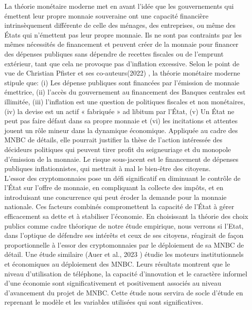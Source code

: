 \documentclass[12pt]{article}
\begin{document}
La théorie monétaire moderne met en avant l'idée que les gouvernements qui émettent leur propre monnaie souveraine ont une capacité financière intrinsèquement différente de celle des ménages, des entreprises, ou même des États qui n'émettent pas leur propre monnaie. Ils ne sont pas contraints par les mêmes nécessités de financement et peuvent créer de la monnaie pour financer des dépenses publiques sans dépendre de recettes fiscales ou de l'emprunt extérieur, tant que cela ne provoque pas d'inflation excessive. Selon le point de vue de Christian Pfister et ses co-auteurs(2022) \cite{drumetz_modern_2021}, la théorie monétaire moderne stipule que: (i) Les dépense publiques sont financées par l’émission de monnaie émettrice, (ii) l’accès du gouvernement au financement des Banques centrales est illimitée, (iii) l’inflation est une question de politiques fiscales et non monétaires, (iv) la devise est un actif « fabriquée » ad libitum par l’État, (v) Un État ne peut pas faire défaut dans sa propre monnaie et (vi) les incitations et attentes jouent un rôle mineur dans la dynamique économique. Appliquée au cadre des MNBC de détails, elle pourrait justifier la thèse de l'action intéressée des décideurs politiques qui peuvent tirer profit du seigneuriage et du monopole d'émission de la monnaie. Le risque sous-jacent est le financement de dépenses publiques inflationnistes, qui mettrait à mal le bien-être des citoyens. \\

L'essor des cryptomonnaies pose un défi significatif en diminuant le contrôle de l'État sur l'offre de monnaie, en compliquant la collecte des impôts, et en introduisant une concurrence qui peut éroder la demande pour la monnaie nationale. Ces facteurs combinés compromettent la capacité de l'État à gérer efficacement sa dette et à stabiliser l'économie. En choisissant la théorie des choix publics comme cadre théorique de notre étude empirique, nous verrons si l'Etat, dans l'optique de défendre ses intérêts et ceux de ses citoyens, réagirait de façon proportionnelle à l'essor des cryptomonnaies par le déploiement de sa MNBC de détail. Une étude similaire (Auer et al., 2023 \cite{RePEc:bis:biswps:880}) étudie les moteurs institutionnels et économiques au déploiement des MNBC. Leurs résultats montrent que le niveau d'utilisation de téléphone, la capacité d'innovation et le caractère informel d'une économie sont significativement et positivement associés au niveau d'avancement du projet de MNBC. Cette étude nous servira de socle d'étude en reprenant le modèle et les variables utilisées qui sont significatives.
\end{document}

